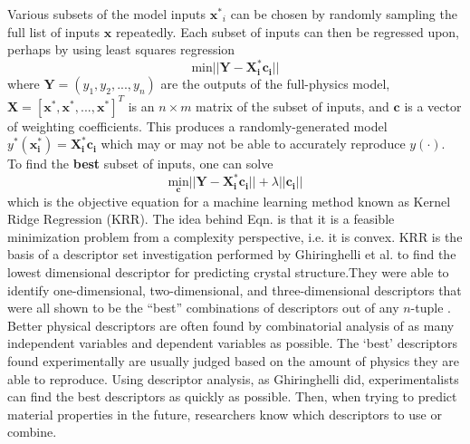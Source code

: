 Various subsets of the model inputs $\mathbf{x^*}_i$ can be chosen by randomly sampling the full list of inputs $\mathbf{x}$ repeatedly. Each subset of inputs can then be regressed upon, perhaps by using least squares regression
\begin{equation}
	\text{min} ||\mathbf{Y} - \mathbf{X^*_i} \mathbf{c_i}||
	\label{obj2}
\end{equation}
where $\mathbf{Y} = (y_1,y_2,...,y_n)$ are the outputs of the full-physics model, $\mathbf{X} = \left[ \mathbf{x^*} ,\mathbf{x^*},...,\mathbf{x^*}\right]^T$ is an $n \times m$ matrix of the subset of inputs, and $\mathbf{c}$ is a vector of weighting coefficients. This produces a randomly-generated model $y^*(\mathbf{x^*_i}) = \mathbf{X^*_i}\mathbf{c_i}$ which may or may not be able to accurately reproduce $y(\cdot)$. To find the \textbf{best} subset of inputs, one can solve 
\begin{equation}
	\underset{\mathbf{c}}{\text{min}}|| \mathbf{Y} - \mathbf{X^*_i} \mathbf{c_i}|| + \lambda||\mathbf{c_i}||
	\label{KRR}
\end{equation}
which is the objective equation for a machine learning method known as Kernel Ridge Regression (KRR). The idea behind Eqn. \label{KRR} is that it is a feasible minimization problem from a complexity perspective, i.e. it is convex. KRR is the basis of a descriptor set investigation performed by Ghiringhelli et al. to find the lowest dimensional descriptor for predicting crystal structure.They were able to identify one-dimensional, two-dimensional, and three-dimensional descriptors that were all shown to be the ``best'' combinations of descriptors out of any $n$-tuple \cite{Ghiringhelli2015}. Better physical descriptors are often found by combinatorial analysis of as many independent variables and dependent variables as possible. The `best' descriptors found experimentally are usually judged based on the amount of physics they are able to reproduce. Using descriptor analysis, as Ghiringhelli did, experimentalists can find the best descriptors as quickly as possible. Then, when trying to predict material properties in the future, researchers know which descriptors to use or combine.